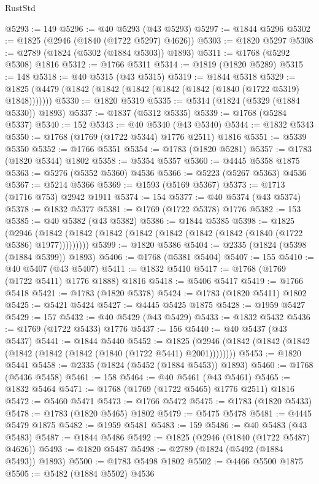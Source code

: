 \begin{lexlean}{RustStd}
\begin{coremodule}
@5293 := 149
@5296 := @40 @5293 (@43 @5293)
@5297 := @1844 @5296
@5302 := @1825 (@2946 (@1840 (@1722 @5297) @4626))
@5303 := @1820 @5297
@5308 := @2789 (@1824 (@5302 (@1884 @5303)) @1893)
@5311 := @1768 (@5292 @5308) @1816
@5312 := @1766 @5311
@5314 := @1819 (@1820 @5289)
@5315 := 148
@5318 := @40 @5315 (@43 @5315)
@5319 := @1844 @5318
@5329 := @1825 (@4479 (@1842 (@1842 (@1842 (@1842 (@1842 (@1840 (@1722 @5319) @1848)))))))
@5330 := @1820 @5319
@5335 := @5314 (@1824 (@5329 (@1884 @5330)) @1893)
@5337 := @1837 (@5312 @5335)
@5339 := @1768 (@5284 @5337)
@5340 := 152
@5343 := @40 @5340 (@43 @5340)
@5344 := @1832 @5343
@5350 := @1768 (@1769 (@1722 @5344) @1776 @2511) @1816
@5351 := @5339 @5350
@5352 := @1766 @5351
@5354 := @1783 (@1820 @5281)
@5357 := @1783 (@1820 @5344) @1802
@5358 := @5354 @5357
@5360 := @4445 @5358 @1875
@5363 := @5276 (@5352 @5360) @4536
@5366 := @5223 (@5267 @5363) @4536
@5367 := @5214 @5366
@5369 := @1593 (@5169 @5367)
@5373 := @1713 (@1716 @753) @2942 @1911
@5374 := 154
@5377 := @40 @5374 (@43 @5374)
@5378 := @1832 @5377
@5381 := @1769 (@1722 @5378) @1776
@5382 := 153
@5385 := @40 @5382 (@43 @5382)
@5386 := @1844 @5385
@5398 := @1825
    (@2946 (@1842 (@1842 (@1842 (@1842 (@1842 (@1842 (@1842 (@1840 (@1722 @5386) @1977)))))))))
@5399 := @1820 @5386
@5404 := @2335 (@1824 (@5398 (@1884 @5399)) @1893)
@5406 := @1768 (@5381 @5404)
@5407 := 155
@5410 := @40 @5407 (@43 @5407)
@5411 := @1832 @5410
@5417 := @1768 (@1769 (@1722 @5411) @1776 @1888) @1816
@5418 := @5406 @5417
@5419 := @1766 @5418
@5421 := @1783 (@1820 @5378)
@5424 := @1783 (@1820 @5411) @1802
@5425 := @5421 @5424
@5427 := @4445 @5425 @1875
@5428 := @1959 @5427
@5429 := 157
@5432 := @40 @5429 (@43 @5429)
@5433 := @1832 @5432
@5436 := @1769 (@1722 @5433) @1776
@5437 := 156
@5440 := @40 @5437 (@43 @5437)
@5441 := @1844 @5440
@5452 := @1825 (@2946 (@1842 (@1842 (@1842 (@1842 (@1842 (@1842 (@1840 (@1722 @5441) @2001))))))))
@5453 := @1820 @5441
@5458 := @2335 (@1824 (@5452 (@1884 @5453)) @1893)
@5460 := @1768 (@5436 @5458)
@5461 := 158
@5464 := @40 @5461 (@43 @5461)
@5465 := @1832 @5464
@5471 := @1768 (@1769 (@1722 @5465) @1776 @2511) @1816
@5472 := @5460 @5471
@5473 := @1766 @5472
@5475 := @1783 (@1820 @5433)
@5478 := @1783 (@1820 @5465) @1802
@5479 := @5475 @5478
@5481 := @4445 @5479 @1875
@5482 := @1959 @5481
@5483 := 159
@5486 := @40 @5483 (@43 @5483)
@5487 := @1844 @5486
@5492 := @1825 (@2946 (@1840 (@1722 @5487) @4626))
@5493 := @1820 @5487
@5498 := @2789 (@1824 (@5492 (@1884 @5493)) @1893)
@5500 := @1783 @5498 @1802
@5502 := @4466 @5500 @1875
@5505 := @5482 (@1884 @5502) @4536

\end{coremodule}
\end{lexlean}
